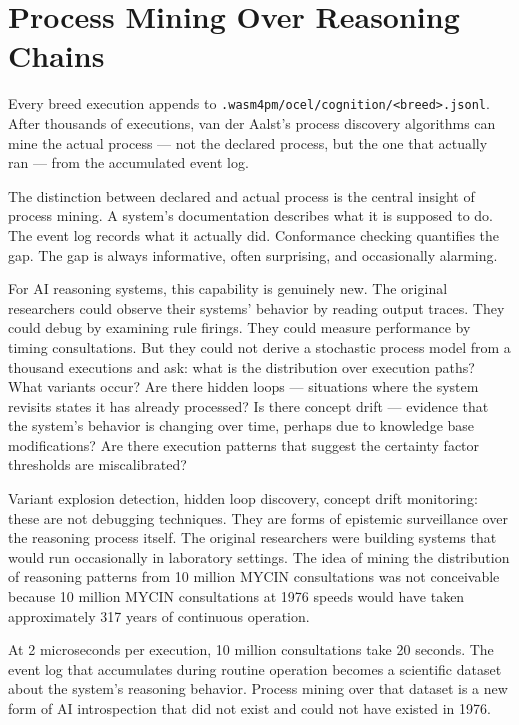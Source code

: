 \section{Process Mining Over Reasoning Chains}
\label{sec:process-mining}

Every breed execution appends to
\texttt{.wasm4pm/ocel/cognition/<breed>.jsonl}. After thousands of executions,
van der Aalst's process discovery algorithms can mine the actual process --- not the declared
process, but the one that actually ran --- from the accumulated event log.

The distinction between declared and actual process is the central insight of process mining.
A system's documentation describes what it is supposed to do. The event log records what it
actually did. Conformance checking quantifies the gap. The gap is always informative, often
surprising, and occasionally alarming.

For AI reasoning systems, this capability is genuinely new. The original researchers could
observe their systems' behavior by reading output traces. They could debug by examining rule
firings. They could measure performance by timing consultations. But they could not derive
a stochastic process model from a thousand executions and ask: what is the distribution over
execution paths? What variants occur? Are there hidden loops --- situations where the system
revisits states it has already processed? Is there concept drift --- evidence that the
system's behavior is changing over time, perhaps due to knowledge base modifications? Are
there execution patterns that suggest the certainty factor thresholds are miscalibrated?

Variant explosion detection, hidden loop discovery, concept drift monitoring: these are
not debugging techniques. They are forms of epistemic surveillance over the reasoning
process itself. The original researchers were building systems that would run occasionally
in laboratory settings. The idea of mining the distribution of reasoning patterns from
10 million MYCIN consultations was not conceivable because 10 million MYCIN consultations
at 1976 speeds would have taken approximately 317 years of continuous operation.

At 2 microseconds per execution, 10 million consultations take 20 seconds. The event
log that accumulates during routine operation becomes a scientific dataset about the
system's reasoning behavior. Process mining over that dataset is a new form of AI
introspection that did not exist and could not have existed in 1976.

